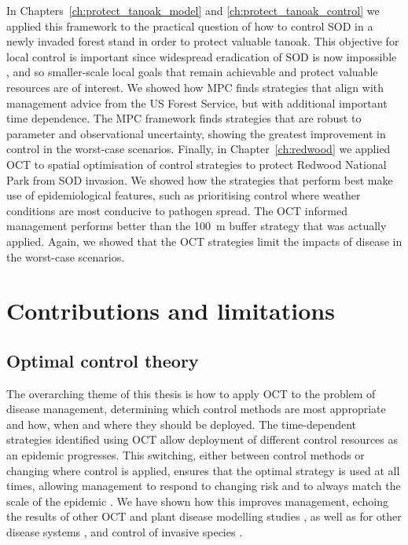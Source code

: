 In Chapters~\ref{ch:protect_tanoak_model} and \ref{ch:protect_tanoak_control} we applied this framework to the practical question of how to control SOD in a newly invaded forest stand in order to protect valuable tanoak. This objective for local control is important since widespread eradication of SOD is now impossible \citep{cunniffe_modelling_2016}, and so smaller-scale local goals that remain achievable and protect valuable resources are of interest. We showed how MPC finds strategies that align with management advice from the US Forest Service, but with additional important time dependence. The MPC framework finds strategies that are robust to parameter and observational uncertainty, showing the greatest improvement in control in the worst-case scenarios. Finally, in Chapter~\ref{ch:redwood} we applied OCT to spatial optimisation of control strategies to protect Redwood National Park from SOD invasion. We showed how the strategies that perform best make use of epidemiological features, such as prioritising control where weather conditions are most conducive to pathogen spread. The OCT informed management performs better than the \SI{100}{\meter} buffer strategy that was actually applied. Again, we showed that the OCT strategies limit the impacts of disease in the worst-case scenarios.

\section{Contributions and limitations}

\subsection{Optimal control theory}\label{sec:ch8:contributions_oct}

The overarching theme of this thesis is how to apply OCT to the problem of disease management, determining which control methods are most appropriate and how, when and where they should be deployed. The time-dependent strategies identified using OCT allow deployment of different control resources as an epidemic progresses. This switching, either between control methods or changing where control is applied, ensures that the optimal strategy is used at all times, allowing management to respond to changing risk \citep{hyatt-twynam_risk-based_2017} and to always match the scale of the epidemic \citep{gilligan_impact_2007}. We have shown how this improves management, echoing the results of other OCT and plant disease modelling studies \citep[e.g.][]{forster_optimizing_2007, ndeffo_mbah_resource_2011}, as well as for other disease systems \citep{keeling_optimal_2012,klepac_optimizing_2012}, and control of invasive species \citep{carrasco_optimal_2009}.

